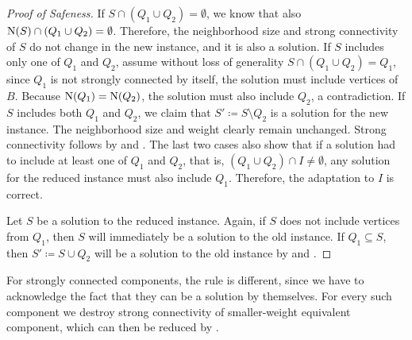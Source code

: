 \begin{theorem}
\begin{lemma}
\begin{theorem}
\begin{lemma}
\begin{reduction*}
\begin{reduction*}
\begin{reduction*}
\begin{proof}[Proof of Safeness]
  If $S \cap (Q_1 \cup Q_2) = \emptyset$, we know that also $\operatorname{N}({S}) \cap (Q_1 \cup Q_2) = \emptyset$. Therefore, the neighborhood size and strong connectivity of $S$ do not change in the new instance, and it is also a solution.
  If $S$ includes only one of $Q_1$ and $Q_2$, assume without loss of generality $S \cap (Q_1 \cup Q_2) = Q_1$, since $Q_1$ is not strongly connected by itself, the solution must include vertices of $B$. Because $\operatorname{N}({Q_1}) = \operatorname{N}({Q_2})$, the solution must also include $Q_2$, a contradiction.
  If $S$ includes both $Q_1$ and $Q_2$, we claim that $S' \coloneqq S \setminus Q_2$ is a solution for the new instance. The neighborhood size and weight clearly remain unchanged. %
  Strong connectivity follows by  and .
  The last two cases also show that if a solution had to include at least one of $Q_1$ and $Q_2$, that is, $(Q_1 \cup Q_2) \cap I \ne \emptyset$, any solution for the reduced instance must also include $Q_1$. Therefore, the adaptation to $I$ is correct.

  Let $S$ be a solution to the reduced instance. Again, if $S$ does not include vertices from $Q_1$, then $S$ will immediately be a solution to the old instance. If $Q_1 \subseteq S$, then $S' \coloneqq S \cup Q_2$ will be a solution to the old instance by  and .
\end{proof}
\fi

For strongly connected components, the rule is different, since we have to acknowledge the fact that they can be a solution by themselves. For every such component we destroy strong connectivity of smaller-weight equivalent component, which can then be reduced by .



\end{reduction*}
\end{reduction*}
\end{reduction*}
\end{lemma}
\end{theorem}
\end{lemma}
\end{theorem}
